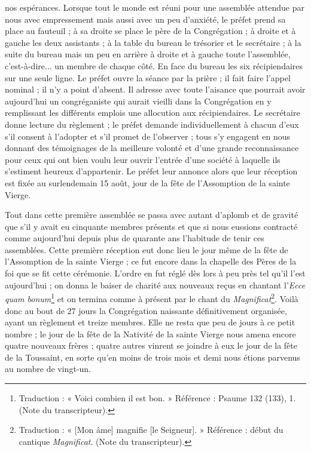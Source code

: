 nos espérances. Lorsque tout le monde est réuni pour une assemblée attendue par nous avec empressement mais aussi avec un peu d'anxiété, le préfet prend sa place au fauteuil ; à sa droite se place le père de la Congrégation ; à droite et à gauche les deux assistants ; à la table du bureau le trésorier et le secrétaire ; à la suite du bureau mais un peu en arrière à droite et à gauche toute l'assemblée, c'est-à-dire... un membre de chaque côté. En face du bureau les six récipiendaires sur une seule ligne. Le préfet ouvre la séance par la prière ; il fait faire l'appel nominal ; il n'y a point d'absent. Il adresse avec toute l'aisance que pourrait avoir aujourd'hui un congréganiste qui aurait vieilli dans la Congrégation en y remplissant les différents emplois une allocution aux récipiendaires. Le secrétaire donne lecture du règlement ; le préfet demande individuellement à chacun d'eux s'il consent à l'adopter et s'il promet de l'observer ; tous s'y engagent en nous donnant des témoignages de la meilleure volonté et d'une grande reconnaissance pour ceux qui ont bien voulu leur ouvrir l'entrée d'une société à laquelle ils s'estiment heureux d'appartenir. Le préfet leur annonce alors que leur réception est fixée au surlendemain 15 août, jour de la fête de l'Assomption de la sainte Vierge.

Tout dans cette première assemblée se passa avec autant d'aplomb et de gravité que s'il y avait eu cinquante membres présents et que si nous eussions contracté comme aujourd'hui depuis plus de quarante ans l'habitude de tenir ces assemblées. Cette première réception eut donc lieu le
jour même de la fête de l'Assomption de la sainte Vierge ; ce fut encore dans la chapelle des Pères de la foi que se fit cette cérémonie. L'ordre en fut réglé dès lors à peu près tel qu'il l'est aujourd'hui ; on donna le baiser de charité aux nouveaux reçus en chantant l'\textit{Ecce quam bonum}\footnote{Traduction : « Voici combien il est bon. » Référence : Psaume 132 (133), 1. (Note du transcripteur).} et on termina comme à présent par le chant du \textit{Magnificat}\footnote{Traduction : « [Mon âme] magnifie [le Seigneur]. » Référence : début du cantique \textit{Magnificat}. (Note du transcripteur).}. Voilà donc au bout de 27 jours la Congrégation naissante définitivement organisée, ayant un règlement et treize membres. Elle ne resta que peu de jours à ce petit nombre ; le jour de la fête de la Nativité de la sainte Vierge nous amena encore quatre nouveaux frères ; quatre autres vinrent se joindre à eux le jour de la fête de la Toussaint, en sorte qu'en moins de trois mois et demi nous étions parvenus au nombre de vingt-un.
